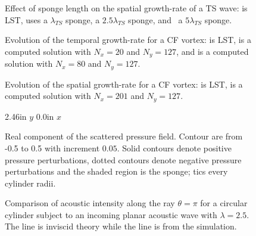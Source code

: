 %
\begin{figure}[p]
\centering
{}
\setvlabel{$\sigma$}
\epsfxsize=5.0in 
\caption[Effect of sponge length on the spatial growth-rate of a TS
wave] {Effect of sponge length on the spatial growth-rate of a TS wave: \solid
is LST, \dashed uses a $\lambda_{TS}$ sponge, \dotted a $2.5\lambda_{TS}$
sponge, and \chndash\ a $5\lambda_{TS}$ sponge.
\label{f:stsgrowth3}}
\end{figure}
%
%
\begin{figure}[p]
\centering
{}
\setvlabel{$\sigma$}
\epsfxsize=5.0in 
\caption[Evolution of the temporal growth-rate for a CF vortex] {Evolution of
the temporal growth-rate for a CF vortex: \solid is LST, \dashed is a computed
solution with $N_x=20$ and $N_y=127$, and \dotted is a computed solution with
$N_x=80$ and $N_y=127$. \label{f:tcfgrowth}}
\end{figure}
%
\begin{figure}[p]
\centering
{}
\setvlabel{$\sigma$}
\epsfxsize=5.0in 
\caption[Evolution of the spatial growth-rate for a CF vortex] {Evolution of
the spatial growth-rate for a CF vortex: \solid is LST, \dashed is a computed
solution with $N_x=201$ and $N_y=127$. \label{f:scfgrowth}}
\end{figure}
%
%
\begin{figure}[p]
\centering
\figlab -0.156in 2.46in {$y$} 
\figlab 5.0in 0.0in {$x$} 
\epsfxsize=5.0in 
\caption[Real component of the scattered pressure disturbance field] {Real
component of the scattered pressure field. Contour are from -0.5 to 0.5 with
increment $0.05$.  Solid contours denote positive pressure perturbations,
dotted contours denote negative pressure perturbations and the shaded region
is the sponge; tics every cylinder radii. \label{f:scatter}}
\end{figure}
%
\begin{figure}[p]
\centering
{}
\epsfxsize=5.0in 
\caption[Comparison of acoustic intensity] {Comparison of acoustic intensity
along the ray $\theta=\pi$ for a circular cylinder subject to an incoming
planar acoustic wave with $\lambda=2.5$. The \solid line is inviscid theory
while the \dashed line is from the simulation. \label{f:intense}}
\end{figure}
%
